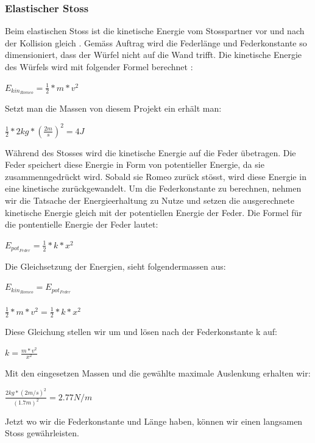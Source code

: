 \documentclass[../main.tex]{subfiles}
\begin{document}
\subsubsection{Elastischer Stoss}
Beim elastischen Stoss ist die kinetische Energie vom Stosspartner vor und nach der Kollision
gleich \cite{tiplerpaula.PhysikFurStudierende}. Gemäss Auftrag wird die Federlänge und Federkonstante
so dimensioniert, dass der Würfel nicht auf die Wand trifft.
Die kinetische Energie des Würfels wird mit folgender Formel berechnet \cite{tiplerpaula.PhysikFurStudierende}:
\begin{mdframed}
$E_{kin_{Romeo}}=\frac{1}{2} * m * v^{2}$
\end{mdframed}
Setzt man die Massen von diesem Projekt ein erhält man:
\begin{mdframed}
$\frac{1}{2} * 2kg * (\frac{2m}{s})^{2} = 4J$
\end{mdframed}
Während des Stosses wird die kinetische Energie auf die Feder übetragen. Die Feder speichert diese
Energie in Form von potentieller Energie, da sie zusammenngedrückt wird. Sobald sie Romeo zurück
stösst, wird diese Energie in eine kinetische zurückgewandelt.\newline
Um die Federkonstante zu berechnen, nehmen wir die Tatsache der Energieerhaltung zu Nutze und
setzen die ausgerechnete kinetische Energie gleich mit der potentiellen Energie der Feder.\newline
Die Formel für die pontentielle Energie der Feder lautet\cite{tiplerpaula.PhysikFurStudierende}:
\begin{mdframed}
$E_{pot_{Feder}}=\frac{1}{2} * k * x^{2}$
\end{mdframed}
Die Gleichsetzung der Energien, sieht folgendermassen aus\cite{tiplerpaula.PhysikFurStudierende}:
\begin{mdframed}
$E_{kin_{Romeo}}=E_{pot_{Feder}}$\\\\
$\frac{1}{2} * m * v^{2} = \frac{1}{2} * k * x^{2}$
\end{mdframed}
Diese Gleichung stellen wir um und lösen nach der Federkonstante k auf:
\begin{mdframed}
$ k=\frac{m * v^{2}}{x^{2}}$
\end{mdframed}
Mit den eingesetzen Massen und die gewählte maximale Auslenkung erhalten wir:
\begin{mdframed}
$\frac{2kg*(2m/s)^{2}}{(1.7m)^{2}} = 2.77N/m$
\end{mdframed}
Jetzt wo wir die Federkonstante und Länge haben, können wir einen langsamen Stoss gewährleisten.
\newpage
\end{document}
